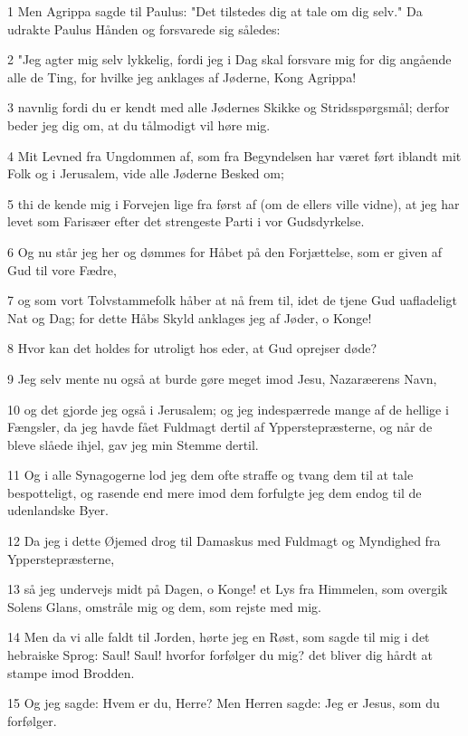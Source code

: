 \par 1 Men Agrippa sagde til Paulus: "Det tilstedes dig at tale om dig selv." Da udrakte Paulus Hånden og forsvarede sig således:
\par 2 "Jeg agter mig selv lykkelig, fordi jeg i Dag skal forsvare mig for dig angående alle de Ting, for hvilke jeg anklages af Jøderne, Kong Agrippa!
\par 3 navnlig fordi du er kendt med alle Jødernes Skikke og Stridsspørgsmål; derfor beder jeg dig om, at du tålmodigt vil høre mig.
\par 4 Mit Levned fra Ungdommen af, som fra Begyndelsen har været ført iblandt mit Folk og i Jerusalem, vide alle Jøderne Besked om;
\par 5 thi de kende mig i Forvejen lige fra først af (om de ellers ville vidne), at jeg har levet som Farisæer efter det strengeste Parti i vor Gudsdyrkelse.
\par 6 Og nu står jeg her og dømmes for Håbet på den Forjættelse, som er given af Gud til vore Fædre,
\par 7 og som vort Tolvstammefolk håber at nå frem til, idet de tjene Gud uafladeligt Nat og Dag; for dette Håbs Skyld anklages jeg af Jøder, o Konge!
\par 8 Hvor kan det holdes for utroligt hos eder, at Gud oprejser døde?
\par 9 Jeg selv mente nu også at burde gøre meget imod Jesu, Nazaræerens Navn,
\par 10 og det gjorde jeg også i Jerusalem; og jeg indespærrede mange af de hellige i Fængsler, da jeg havde fået Fuldmagt dertil af Ypperstepræsterne, og når de bleve slåede ihjel, gav jeg min Stemme dertil.
\par 11 Og i alle Synagogerne lod jeg dem ofte straffe og tvang dem til at tale bespotteligt, og rasende end mere imod dem forfulgte jeg dem endog til de udenlandske Byer.
\par 12 Da jeg i dette Øjemed drog til Damaskus med Fuldmagt og Myndighed fra Ypperstepræsterne,
\par 13 så jeg undervejs midt på Dagen, o Konge! et Lys fra Himmelen, som overgik Solens Glans, omstråle mig og dem, som rejste med mig.
\par 14 Men da vi alle faldt til Jorden, hørte jeg en Røst, som sagde til mig i det hebraiske Sprog: Saul! Saul! hvorfor forfølger du mig? det bliver dig hårdt at stampe imod Brodden.
\par 15 Og jeg sagde: Hvem er du, Herre? Men Herren sagde: Jeg er Jesus, som du forfølger.

